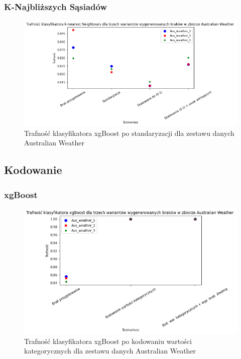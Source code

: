 \documentclass{book}
\begin{document}
\subsubsection{K-Najbliższych Sąsiadów}
\begin{figure}[H]
    \centerline{\includegraphics[scale=0.5]{Aus_Weather_knn_Standaryzacja}}
    \centering
    \caption{Trafność klasyfikatora xgBoost po standaryzacji dla zestawu danych Australian Weather}
    \end{figure}

\subsection{Kodowanie}
\subsubsection{xgBoost} 
\begin{figure}[H]
    \centerline{\includegraphics[scale=0.5]{Aus_Weather_xgb_Kodowanie}}
    \centering
    \caption{Trafność klasyfikatora xgBoost po kodowaniu wartości kategorycznych dla zestawu danych Australian Weather}
    \end{figure}
\end{document}
